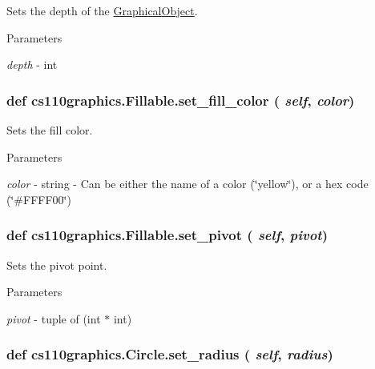 Sets the depth of the \hyperlink{classcs110graphics_1_1GraphicalObject}{GraphicalObject}. 
\begin{DoxyParams}{Parameters}
\item[{\em depth}]-\/ int \end{DoxyParams}
\hypertarget{classcs110graphics_1_1Fillable_a4f24c7186c8d057e42a0209eb1d56be7}{
\subsubsection[{set\_\-fill\_\-color}]{\setlength{\rightskip}{0pt plus 5cm}def cs110graphics.Fillable.set\_\-fill\_\-color ( {\em self}, \/   {\em color})}}
\label{classcs110graphics_1_1Fillable_a4f24c7186c8d057e42a0209eb1d56be7}


Sets the fill color. 
\begin{DoxyParams}{Parameters}
\item[{\em color}]-\/ string -\/ Can be either the name of a color (\char`\"{}yellow\char`\"{}), or a hex code (\char`\"{}\#FFFF00\char`\"{}) \end{DoxyParams}
\hypertarget{classcs110graphics_1_1Fillable_a2a6066d1a11c0854ff5ee85e7d9ceb54}{
\subsubsection[{set\_\-pivot}]{\setlength{\rightskip}{0pt plus 5cm}def cs110graphics.Fillable.set\_\-pivot ( {\em self}, \/   {\em pivot})}}
\label{classcs110graphics_1_1Fillable_a2a6066d1a11c0854ff5ee85e7d9ceb54}


Sets the pivot point. 
\begin{DoxyParams}{Parameters}
\item[{\em pivot}]-\/ tuple of (int $\ast$ int) \end{DoxyParams}
\hypertarget{classcs110graphics_1_1Circle_a39b0cb138b31565d2a52180a2b03cc31}{
\subsubsection[{set\_\-radius}]{\setlength{\rightskip}{0pt plus 5cm}def cs110graphics.Circle.set\_\-radius ( {\em self}, \/   {\em radius})}}
\label{classcs110graphics_1_1Circle_a39b0cb138b31565d2a52180a2b03cc31}


